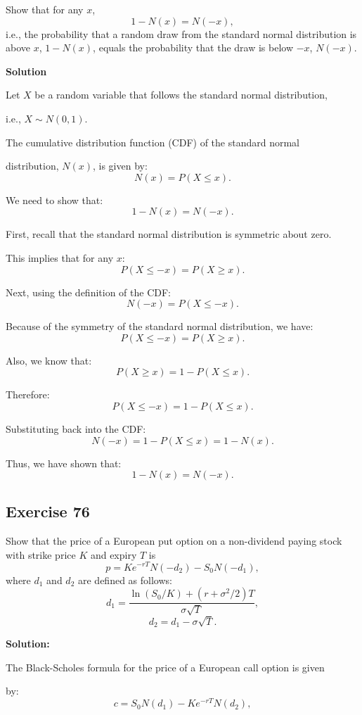 \documentclass{article}
\begin{document}
Show that for any \( x \),
\[
1 - N(x) = N(-x),
\]
i.e., the probability that a random draw from the standard normal distribution is above \( x \), \( 1 - N(x) \), equals the probability that the draw is below \( -x \), \( N(-x) \).

\textbf{Solution}

Let \( X \) be a random variable that follows the standard normal distribution, 

i.e., \( X \sim N(0, 1) \).

\vspace{\baselineskip}

The cumulative distribution function (CDF) of the standard normal 

distribution, \( N(x) \), is given by:
\[
N(x) = P(X \leq x).
\]

We need to show that:
\[
1 - N(x) = N(-x).
\]

First, recall that the standard normal distribution is symmetric about zero. 

This implies that for any \( x \):
\[
P(X \leq -x) = P(X \geq x).
\]

Next, using the definition of the CDF:
\[
N(-x) = P(X \leq -x).
\]

Because of the symmetry of the standard normal distribution, we have:
\[
P(X \leq -x) = P(X \geq x).
\]

Also, we know that:
\[
P(X \geq x) = 1 - P(X \leq x).
\]

Therefore:
\[
P(X \leq -x) = 1 - P(X \leq x).
\]

Substituting back into the CDF:
\[
N(-x) = 1 - P(X \leq x) = 1 - N(x).
\]

Thus, we have shown that:
\[
1 - N(x) = N(-x).
\]

\subsection*{Exercise 76}

Show that the price of a European put option on a non-dividend paying stock with strike price \( K \) and expiry \( T \) is
\[
p = Ke^{-rT} N(-d_2) - S_0 N(-d_1),
\]
where \( d_1 \) and \( d_2 \) are defined as follows:
\[
d_1 = \frac{\ln(S_0 / K) + (r + \sigma^2 / 2) T}{\sigma \sqrt{T}},
\]
\[
d_2 = d_1 - \sigma \sqrt{T}.
\]

\textbf{Solution:}

The Black-Scholes formula for the price of a European call option is given 

by:
\[
c = S_0 N(d_1) - Ke^{-rT} N(d_2),
\]
\end{document}

